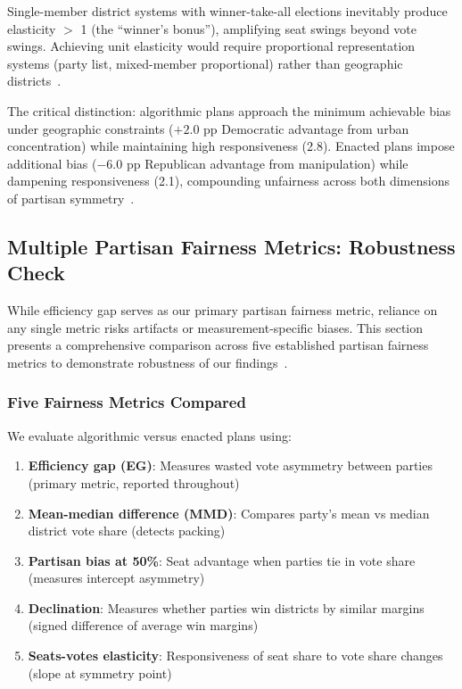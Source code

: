 Single-member district systems with winner-take-all elections inevitably produce elasticity $>$ 1 (the ``winner's bonus''), amplifying seat swings beyond vote swings. Achieving unit elasticity would require proportional representation systems (party list, mixed-member proportional) rather than geographic districts~\cite{taagepera1989seats}.

The critical distinction: algorithmic plans approach the minimum achievable bias under geographic constraints ($+2.0$ pp Democratic advantage from urban concentration) while maintaining high responsiveness (2.8). Enacted plans impose additional bias ($-6.0$ pp Republican advantage from manipulation) while dampening responsiveness (2.1), compounding unfairness across both dimensions of partisan symmetry~\cite{mcdonald2006comparative}.

\subsection{Multiple Partisan Fairness Metrics: Robustness Check}
\label{sec:multiple-metrics-comparison}

While efficiency gap serves as our primary partisan fairness metric, reliance on any single metric risks artifacts or measurement-specific biases. This section presents a comprehensive comparison across five established partisan fairness metrics to demonstrate robustness of our findings~\cite{goedert2020unfair,warshaw2022partisan}.

\subsubsection{Five Fairness Metrics Compared}

We evaluate algorithmic versus enacted plans using:

\begin{enumerate}
    \item \textbf{Efficiency gap (EG)}: Measures wasted vote asymmetry between parties (primary metric, reported throughout)
    \item \textbf{Mean-median difference (MMD)}: Compares party's mean vs median district vote share (detects packing)
    \item \textbf{Partisan bias at 50\%}: Seat advantage when parties tie in vote share (measures intercept asymmetry)
    \item \textbf{Declination}: Measures whether parties win districts by similar margins (signed difference of average win margins)
    \item \textbf{Seats-votes elasticity}: Responsiveness of seat share to vote share changes (slope at symmetry point)
\end{enumerate}


